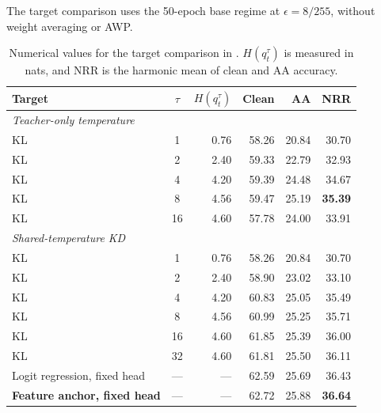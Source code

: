 The target comparison uses the 50-epoch base regime at $\epsilon=8/255$, without weight averaging
or AWP.

\begin{table}[!htbp]
  \centering \small \setlength{\tabcolsep}{4pt}
  \caption{Numerical values for the target comparison in .
  $H(q_t^\tau)$ is measured in nats, and NRR is the harmonic mean of clean and AA accuracy.}
  \label{tab:targetcomparison_values}
  \begin{tabular}{lcrrrr}
    \toprule
    Target & $\tau$ & $H(q_t^\tau)$ & Clean & AA & NRR \\
    \midrule
    \multicolumn{6}{l}{\emph{Teacher-only temperature}} \\
    KL & 1  & 0.76 & 58.26 & 20.84 & 30.70 \\
    KL & 2  & 2.40 & 59.33 & 22.79 & 32.93 \\
    KL & 4  & 4.20 & 59.39 & 24.48 & 34.67 \\
    KL & 8  & 4.56 & 59.47 & 25.19 & \textbf{35.39} \\
    KL & 16 & 4.60 & 57.78 & 24.00 & 33.91 \\
    \midrule
    \multicolumn{6}{l}{\emph{Shared-temperature KD}} \\
    KL & 1  & 0.76 & 58.26 & 20.84 & 30.70 \\
    KL & 2  & 2.40 & 58.90 & 23.02 & 33.10 \\
    KL & 4  & 4.20 & 60.83 & 25.05 & 35.49 \\
    KL & 8  & 4.56 & 60.99 & 25.25 & 35.71 \\
    KL & 16 & 4.60 & 61.85 & 25.39 & 36.00 \\
    KL & 32 & 4.60 & 61.81 & 25.50 & 36.11 \\
    \midrule
    Logit regression, fixed head  & --- & --- & 62.59 & 25.69 & 36.43 \\
    \textbf{Feature anchor, fixed head} & --- & --- & 62.72 & 25.88 & \textbf{36.64} \\
    \bottomrule
  \end{tabular}
\end{table}

